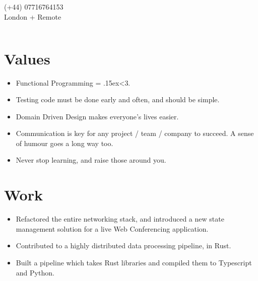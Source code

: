 \documentclass{jcgcv}
\begin{document}
\fontsize{8pt}{1.15em}
\selectfont
{}

\begin{column}


\end{column}\begin{column}

\begin{flushright}
  \\
  \\
  (+44) 07716764153\\
  London + Remote\\
\end{flushright}
  
\end{column}\begin{column}

\section{Values}
\begin{itemize}
  \item Functional Programming = {\raise.15ex\hbox{<}}3.
  \item Testing code must be done early and often, and should be simple.
  \item Domain Driven Design makes everyone's lives easier.
  \item Communication is key for any project / team / company to succeed.
        A sense of humour goes a long way too.
  \item Never stop learning, and raise those around you.
\end{itemize}

\section{Work}

\begin{itemize}
  \item Refactored the entire networking stack, and introduced a new state 
        management solution for a live Web Conferencing application.
  \item Contributed to a highly distributed data processing pipeline, in Rust.
  \item Built a pipeline which takes Rust libraries and compiled them to
        Typescript and Python.
\end{itemize}


\end{column}
\end{document}
